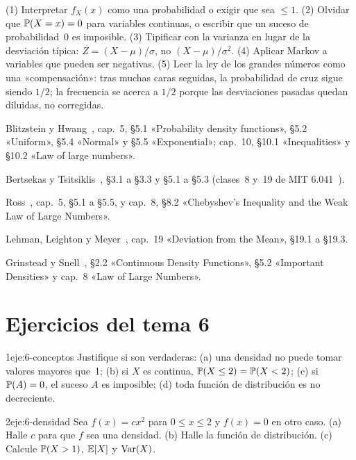 \begin{observacion}
(1) Interpretar $f_X(x)$ como una probabilidad o exigir que sea $\le1$. (2) Olvidar que $\mathbb{P}(X=x)=0$ para variables continuas, o escribir que un suceso de probabilidad~0 es imposible. (3) Tipificar con la varianza en lugar de la desviación típica: $Z=(X-\mu)/\sigma$, no $(X-\mu)/\sigma^{2}$. (4) Aplicar Markov a variables que pueden ser negativas. (5) Leer la ley de los grandes números como una «compensación»: tras muchas caras seguidas, la probabilidad de cruz sigue siendo $1/2$; la frecuencia se acerca a $1/2$ porque las desviaciones pasadas quedan diluidas, no corregidas.
\end{observacion}

\begin{lecturas}
\item Blitzstein y Hwang~\cite{bh}, cap.~5, §5.1 «Probability density functions», §5.2 «Uniform», §5.4 «Normal» y §5.5 «Exponential»; cap.~10, §10.1 «Inequalities» y §10.2 «Law of large numbers».
\item Bertsekas y Tsitsiklis~\cite{bt}, §3.1 a §3.3 y §5.1 a §5.3 (clases~8 y~19 de MIT 6.041~\cite{mit6041f10}).
\item Ross~\cite{ross}, cap.~5, §5.1 a §5.5, y cap.~8, §8.2 «Chebyshev's Inequality and the Weak Law of Large Numbers».
\item Lehman, Leighton y Meyer~\cite{mcs}, cap.~19 «Deviation from the Mean», §19.1 a §19.3.
\item Grinstead y Snell~\cite{gs}, §2.2 «Continuous Density Functions», §5.2 «Important Densities» y cap.~8 «Law of Large Numbers».
\end{lecturas}

\section*{Ejercicios del tema 6}

\begin{ejercicio}{1}{eje:6-conceptos}
Justifique si son verdaderas: (a) una densidad no puede tomar valores mayores que~1; (b) si $X$ es continua, $\mathbb{P}(X\le 2)=\mathbb{P}(X<2)$; (c) si $\mathbb{P}(A)=0$, el suceso $A$ es imposible; (d) toda función de distribución es no decreciente.
\end{ejercicio}

\begin{ejercicio}{2}{eje:6-densidad}
Sea $f(x)=cx^{2}$ para $0\le x\le2$ y $f(x)=0$ en otro caso. (a) Halle $c$ para que $f$ sea una densidad. (b) Halle la función de distribución. (c) Calcule $\mathbb{P}(X>1)$, $\mathbb{E}[X]$ y $\operatorname{Var}(X)$.
\end{ejercicio}

